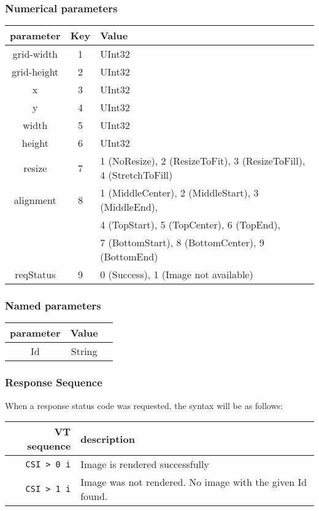 \documentclass{article}
\newcommand{\code}[1]{\colorbox{light-gray}{\texttt{#1}}}
\begin{document}
\subsubsection*{Numerical parameters}

\begin{tabular}{ |c|c|l| }
    \hline
    \textbf{parameter}   & \textbf{Key} & \textbf{Value} \\
    \hline
    grid-width  & 1   & UInt32 \\
    grid-height & 2   & UInt32 \\
    x           & 3   & UInt32 \\
    y           & 4   & UInt32 \\
    width       & 5   & UInt32 \\
    height      & 6   & UInt32 \\
    resize      & 7   & 1 (NoResize), 2 (ResizeToFit), 3 (ResizeToFill), 4 (StretchToFill) \\
    alignment   & 8   & 1 (MiddleCenter), 2 (MiddleStart), 3 (MiddleEnd), \\
                &     & 4 (TopStart), 5 (TopCenter), 6 (TopEnd), \\
                &     & 7 (BottomStart), 8 (BottomCenter), 9 (BottomEnd) \\
    reqStatus   & 9   & 0 (Success), 1 (Image not available) \\
    \hline
\end{tabular}

\subsubsection*{Named parameters}

\begin{tabular}{ |c|c|l| }
    \hline
    \textbf{parameter}   & \textbf{Value} \\
    \hline
    Id          & String \\
    \hline
\end{tabular}

\subsubsection*{Response Sequence}

When a response status code was requested, the syntax will be as follows:

\begin{tabular}{ |r|l| }
    \hline
    \textbf{VT sequence} & \textbf{description} \\
    \hline
    \code{CSI > 0 i} & Image is rendered successfully \\
    \code{CSI > 1 i} & Image was not rendered. No image with the given Id found. \\
    \hline
\end{tabular}
\end{document}
